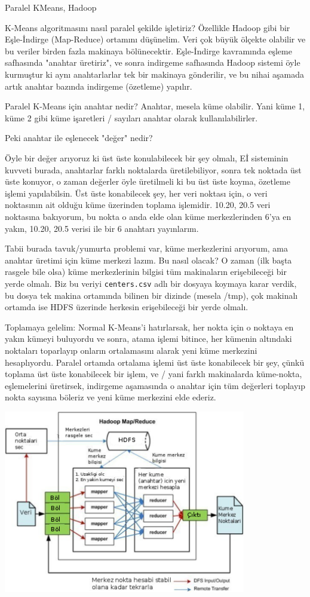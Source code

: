 \documentclass[12pt,fleqn]{article}\usepackage{../../common}
\begin{document}
Paralel KMeans, Hadoop

K-Means algoritmasını nasıl paralel şekilde işletiriz? Özellikle Hadoop gibi bir
Eşle-İndirge (Map-Reduce) ortamını düşünelim. Veri çok büyük ölçekte olabilir ve
bu veriler birden fazla makinaya bölünecektir. Eşle-İndirge kavramında eşleme
safhasında "anahtar üretiriz", ve sonra indirgeme safhasında Hadoop sistemi öyle
kurmuştur ki aynı anahtarlarlar tek bir makinaya gönderilir, ve bu nihai aşamada
artık anahtar bazında indirgeme (özetleme) yapılır.

Paralel K-Means için anahtar nedir? Anahtar, mesela küme olabilir. Yani
küme 1, küme 2 gibi küme işaretleri / sayıları anahtar olarak
kullanılabilirler.

Peki anahtar ile eşlenecek "değer" nedir?

Öyle bir değer arıyoruz ki üst üste konulabilecek bir şey olmalı, Eİ sisteminin
kuvveti burada, anahtarlar farklı noktalarda üretilebiliyor, sonra tek noktada
üst üste konuyor, o zaman değerler öyle üretilmeli ki bu üst üste koyma,
özetleme işlemi yapılabilsin. Üst üste konabilecek şey, her veri noktası için, o
veri noktasının ait olduğu küme üzerinden toplama işlemidir. 10.20, 20.5 veri
noktasına bakıyorum, bu nokta o anda elde olan küme merkezlerinden 6'ya en
yakın, 10.20, 20.5 verisi ile bir 6 anahtarı yayınlarım.

Tabii burada tavuk/yumurta problemi var, küme merkezlerini arıyorum, ama
anahtar üretimi için küme merkezi lazım. Bu nasıl olacak?  O zaman (ilk
başta rasgele bile olsa) küme merkezlerinin bilgisi tüm makinaların
erişebileceği bir yerde olmalı. Biz bu veriyi \verb!centers.csv!  adlı bir
dosyaya koymaya karar verdik, bu dosya tek makina ortamında bilinen bir
dizinde (mesela /tmp), çok makinalı ortamda ise HDFS üzerinde herkesin
erişebileceği bir yerde olmalı.

Toplamaya gelelim: Normal K-Means'i hatırlarsak, her nokta için o noktaya
en yakın kümeyi buluyordu ve sonra, atama işlemi bitince, her kümenin
altındaki noktaları toparlayıp onların ortalamasını alarak yeni küme
merkezini hesaplıyordu. Paralel ortamda ortalama işlemi üst üste
konabilecek bir şey, çünkü toplama üst üste konabilecek bir işlem, ve /
yani farklı makinalarda küme-nokta, eşlemelerini üretirsek, indirgeme
aşamasında o anahtar için tüm değerleri toplayıp nokta sayısına böleriz ve
yeni küme merkezini elde ederiz.

\includegraphics[height=8cm]{kmeans-diag.png}
\end{document}

